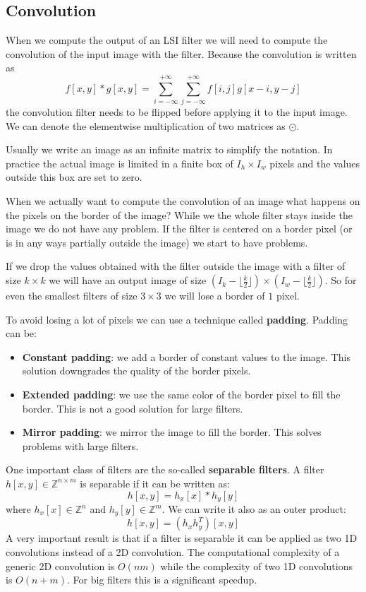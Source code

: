 \subsection{Convolution}
\label{sec:convolution}

When we compute the output of an LSI filter we will need to compute
the convolution of the input image with the filter.
Because the convolution is written as
\[
    f[x,y]*g[x,y]=\sum_{i=-\infty}^{+\infty}\sum_{j=-\infty}^{+\infty}f[i,j]g[x-i,y-j]
\]
the convolution filter needs to be flipped before applying it to the input image.
We can denote the elementwise multiplication of two matrices as $\odot$.

Usually we write an image as an infinite matrix to simplify the notation.
In practice the actual image is limited in a finite box of $I_h\times I_w$ pixels
and the values outside this box are set to zero.

When we actually want to compute the convolution of an image
what happens on the pixels on the border of the image?
While we the whole filter stays inside the image we do not have any problem.
If the filter is centered on a border pixel (or is in any ways partially outside the image)
we start to have problems.

If we drop the values obtained with the filter outside the image with a filter of 
size $k\times k$ we will have an output image of size 
$(I_k-\lfloor\frac{k}{2}\rfloor)\times(I_w-\lfloor\frac{k}{2}\rfloor)$.
So for even the smallest filters of size $3\times 3$ we will lose a border of $1$ pixel.

To avoid losing a lot of pixels we can use a technique called \textbf{padding}.
Padding can be:
\begin{itemize}
    \item \textbf{Constant padding}: we add a border of constant values to the image.
    This solution downgrades the quality of the border pixels.
    \item \textbf{Extended padding}: we use the same color of the border pixel to fill the border.
    This is not a good solution for large filters.
    \item \textbf{Mirror padding}: we mirror the image to fill the border.
    This solves problems with large filters.
\end{itemize}

One important class of filters are the so-called \textbf{separable filters}.
A filter $h[x,y]\in\mathbb{Z}^{n\times m}$ is separable if it can be written as:
\[
    h[x,y]=h_x[x]*h_y[y]
\]
where $h_x[x]\in\mathbb{Z}^n$ and $h_y[y]\in\mathbb{Z}^m$.
We can write it also as an outer product:
\[
    h[x,y]=(h_x h_y^T)[x,y]
\]
A very important result is that if a filter is separable it can
be applied as two 1D convolutions instead of a 2D convolution.
The computational complexity of a generic 2D convolution is $O(nm)$
while the complexity of two 1D convolutions is $O(n+m)$.
For big filters this is a significant speedup.

